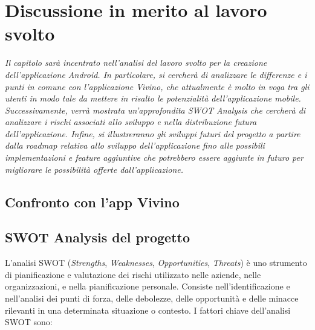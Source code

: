 \chapter{Discussione in merito al lavoro svolto}

\begin{preamble}
{\em
Il capitolo sarà incentrato nell'analisi del lavoro svolto per la creazione dell'applicazione Android. In particolare, si cercherà di analizzare le differenze e i punti in comune con l'applicazione Vivino, che attualmente è molto in voga tra gli utenti in modo tale da mettere in risalto le potenzialità dell'applicazione mobile. \newline \indent Successivamente, verrà mostrata un'approfondita SWOT Analysis che cercherà di analizzare i rischi associati allo sviluppo e nella distribuzione futura dell'applicazione. \newline \indent Infine, si illustreranno gli sviluppi futuri del progetto a partire dalla roadmap relativa allo sviluppo dell'applicazione fino alle possibili implementazioni e feature aggiuntive che potrebbero essere aggiunte in futuro per migliorare le possibilità offerte dall'applicazione. 
}
\end{preamble}


\section{Confronto con l'app Vivino}



\section{SWOT Analysis del progetto}

L'analisi SWOT (\textit{Strengths}, \textit{Weaknesses}, \textit{Opportunities}, \textit{Threats}) è uno strumento di pianificazione e valutazione dei rischi utilizzato nelle aziende, nelle organizzazioni, e nella pianificazione personale. Consiste nell'identificazione e nell'analisi dei punti di forza, delle debolezze, delle opportunità e delle minacce rilevanti in una determinata situazione o contesto. I fattori chiave dell'analisi SWOT sono:

